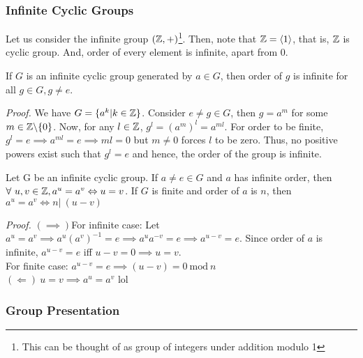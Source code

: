 \subsubsection{Infinite Cyclic Groups}
Let us consider the infinite group $(\mathbb{Z}, +)$\footnote{This can be thought of as group of integers under addition modulo 1}. Then, note that $\mathbb{Z} = \left\langle 1 \right\rangle$, that is, $\mathbb{Z}$ is cyclic group. And, order of every element is infinite, apart from 0. 
\begin{lemma}
    If $G$ is an infinite cyclic group generated by $a\in G$, then order of $g$ is infinite for all $g\in G, g\neq e$.
\end{lemma}
\textit{Proof.} We have $G=\{a^k|k\in \mathbb{Z}\}$. Consider $e \neq g\in G$, then $g=a^m$ for some $m\in \mathbb{Z}\backslash \{0\}$. Now, for any $l\in \mathbb{Z}$, $g^l = (a^m)^l = a^{ml}$. For order to be finite, $g^l = e \implies a^{ml} = e \implies ml=0$ but $m\neq 0$ forces $l$ to be zero. Thus, no positive powers exist such that $g^l=e$ and hence, the order of the group is infinite. 
\begin{lemma}
    Let G be an infinite cyclic group. If $a\neq e \in G$ and $a$ has infinite order, then $\forall \ u,v\in \mathbb{Z}, a^u=a^v \Leftrightarrow u=v$. If $G$ is finite and order of $a$ is $n$, then $a^u=a^v\Leftrightarrow n| \ (u-v)$
\end{lemma}
\textit{Proof.} $(\implies)$For infinite case: Let $a^u = a^v \implies a^u (a^v)^{-1} = e \implies a^u a^{-v} = e \implies a^{u-v} = e$. Since order of $a$ is infinite, $a^{u-v} = e$ iff $u-v=0\implies u=v$.\\[0.3cm]
For finite case: $a^{u-v} = e \implies (u-v) = 0\ \mathrm{mod}\ n$ \\[0.3cm] 
$(\Longleftarrow)\ u = v \implies a^u = a^v$ lol  
\subsubsection{Group Presentation}


